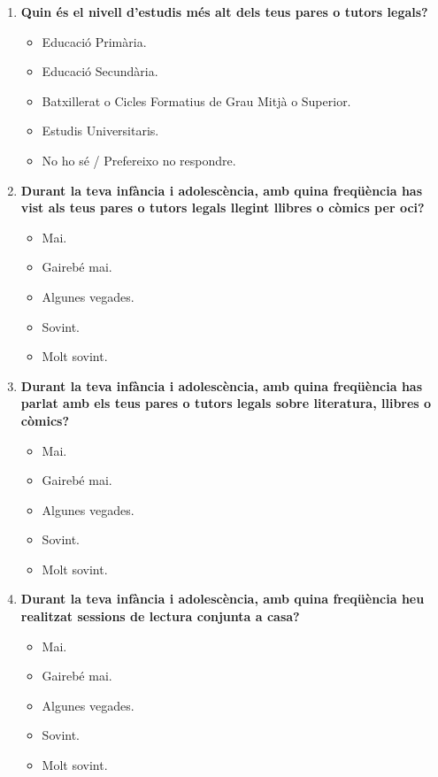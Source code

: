 \documentclass[12pt]{article}
\begin{document}
\begin{enumerate}
    \item \textbf{Quin és el nivell d'estudis més alt dels teus pares o tutors legals?}
    \begin{itemize}
        \item[$\square$] Educació Primària.
        \item[$\square$] Educació Secundària.
        \item[$\square$] Batxillerat o Cicles Formatius de Grau Mitjà o Superior.
        \item[$\square$] Estudis Universitaris.
        \item[$\square$] No ho sé / Prefereixo no respondre.
    \end{itemize}

    \item \textbf{Durant la teva infància i adolescència, amb quina freqüència has vist als teus pares o tutors legals llegint llibres o còmics per oci?}
    \begin{itemize}
        \item[$\square$] Mai.
        \item[$\square$] Gairebé mai.
        \item[$\square$] Algunes vegades.
        \item[$\square$] Sovint.
        \item[$\square$] Molt sovint.
    \end{itemize}

    \item \textbf{Durant la teva infància i adolescència, amb quina freqüència has parlat amb els teus pares o tutors legals sobre literatura, llibres o còmics?}
    \begin{itemize}
        \item[$\square$] Mai.
        \item[$\square$] Gairebé mai.
        \item[$\square$] Algunes vegades.
        \item[$\square$] Sovint.
        \item[$\square$] Molt sovint.
    \end{itemize}

    \item \textbf{Durant la teva infància i adolescència, amb quina freqüència heu realitzat sessions de lectura conjunta a casa?}
    \begin{itemize}
        \item[$\square$] Mai.
        \item[$\square$] Gairebé mai.
        \item[$\square$] Algunes vegades.
        \item[$\square$] Sovint.
        \item[$\square$] Molt sovint.
    \end{itemize}


\end{enumerate}
\end{document}
